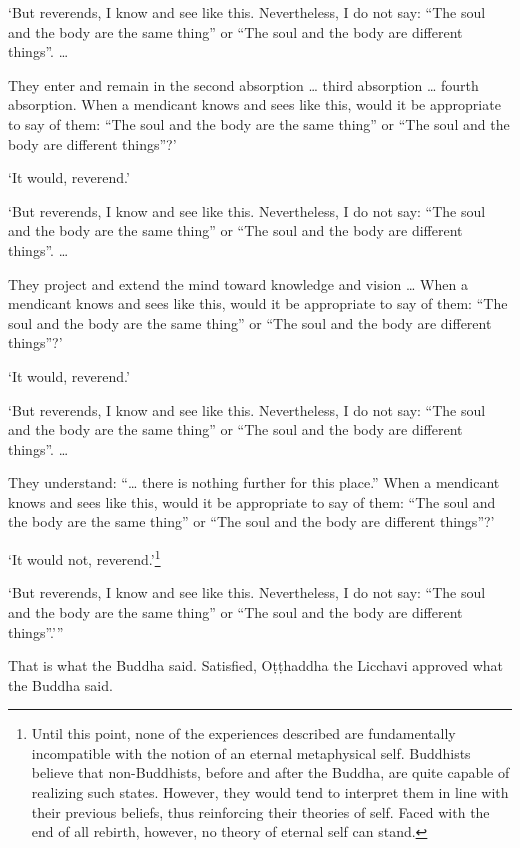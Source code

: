 \documentclass[12pt,openany]{book}%
\begin{document}
‘But reverends, I know and see like this. Nevertheless, I do not say: “The soul and the body are the same thing” or “The soul and the body are different things”. … 

They enter and remain in the second absorption … third absorption … fourth absorption. When a mendicant knows and sees like this, would it be appropriate to say of them: “The soul and the body are the same thing” or “The soul and the body are different things”?’ 

‘It would, reverend.’ 

‘But reverends, I know and see like this. Nevertheless, I do not say: “The soul and the body are the same thing” or “The soul and the body are different things”. … 

They project and extend the mind toward knowledge and vision … When a mendicant knows and sees like this, would it be appropriate to say of them: “The soul and the body are the same thing” or “The soul and the body are different things”?’ 

‘It would, reverend.’ 

‘But reverends, I know and see like this. Nevertheless, I do not say: “The soul and the body are the same thing” or “The soul and the body are different things”. … 

They understand: “… there is nothing further for this place.” When a mendicant knows and sees like this, would it be appropriate to say of them: “The soul and the body are the same thing” or “The soul and the body are different things”?’ 

‘It would not, reverend.’\footnote{Until this point, none of the experiences described are fundamentally incompatible with the notion of an eternal metaphysical self. Buddhists believe that non-Buddhists, before and after the Buddha, are quite capable of realizing such states. However, they would tend to interpret them in line with their previous beliefs, thus reinforcing their theories of self. Faced with the end of all rebirth, however, no theory of eternal self can stand. } 

‘But reverends, I know and see like this. Nevertheless, I do not say: “The soul and the body are the same thing” or “The soul and the body are different things”.’” 

That is what the Buddha said. Satisfied, \textsanskrit{Oṭṭhaddha} the Licchavi approved what the Buddha said. 
\end{document}

